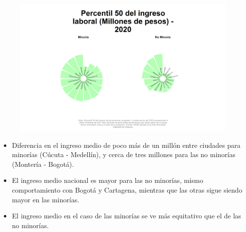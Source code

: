     \begin{figure}[H]
        \caption[Percentil 50 del ingreso laboral por ciudades principales para minorías - 2020]{ \label{ingreso_laboral_50_ciudades_minoria} }
        \begin{center}
        \includegraphics[width=\textwidth,keepaspectratio]{img/var_14_static.png}
        \end{center}
    \end{figure}
            \begin{itemize}
                    \item Diferencia en el ingreso medio de poco más de un millón entre ciudades para minorías (Cúcuta - Medellín), y cerca de tres millones para las no minorías (Montería - Bogotá).
                    \item El ingreso medio nacional es mayor para las no minorías, mismo comportamiento con  Bogotá y Cartagena, mientras que las otras sigue siendo mayor en las minorías.
                    \item El ingreso medio en el caso de las minorías se ve más equitativo que el de las no minorías.
                \end{itemize}

